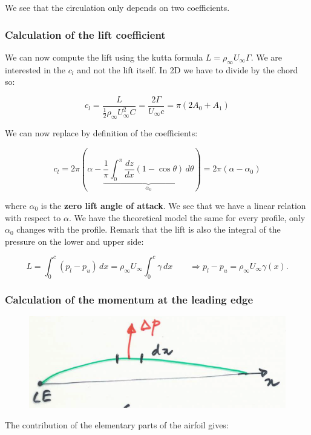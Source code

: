 	We see that the circulation only depends on two coefficients. 
	
\subsubsection{Calculation of the lift coefficient}
We can now compute the lift using the kutta formula $L = \rho _\infty U_\infty \Gamma$. We are interested in the $c_l$ and not the lift itself. In 2D we have to divide by the chord so: 
	
	\begin{equation}
	c_l = \frac{L}{\frac{1}{2} \rho _\infty U_\infty ^2 C} = \frac{2\Gamma}{U_\infty c} = \pi (2A_0 + A_1)
	\label{eq:2.70}
	\end{equation}
	
	We can now replace by definition of the coefficients: 
	
	\begin{equation}
	c_l = 2\pi\left(\alpha - \underbrace{\frac{1}{\pi} \int _0^\pi \frac{dz}{dx} (1-\cos \theta)\, d\theta}_{\alpha _0} \right) = 2\pi (\alpha - \alpha _0)
	\label{eq:2.71}
	\end{equation}
	
	where $\alpha _0$ is the \textbf{zero lift angle of attack}. We see that we have a linear relation with respect to $\alpha$. We have the theoretical model the same for every profile, only $\alpha _0$ changes with the profile. Remark that the lift is also the integral of the pressure on the lower and upper side:
	
	\begin{equation}
	L = \int _0 ^c (p_l - p_u) \, dx = \rho _\infty U_\infty \int _0 ^c \gamma \, dx \qquad \Rightarrow p_l - p_u = \rho _\infty U_\infty \gamma (x).
	\end{equation}
	
\subsubsection{Calculation of the momentum at the leading edge}
	\begin{figure}
	\vspace{-5mm}
	\includegraphics[scale=0.2]{ch2/34}
	\end{figure}
	The contribution of the elementary parts of the airfoil gives:
	
